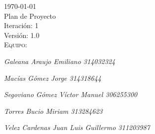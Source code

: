 \begin{titlepage}
\begin{center}
\begin{center}

\end{center}
\vspace{1mm} %
\vspace{1mm} %
{\huge \today}\\[1cm]                                     
\vspace{1mm} %
{\huge Plan de Proyecto}\\[1cm]
\vspace{1mm} %
{\huge Iteración: 1}\\[1cm]
\vspace{1mm} %
{\huge Versión: 1.0}\\[1cm]
\vspace{1mm} %
{\huge \scshape Equipo:}\\
{\Large\itshape Galeana Araujo Emiliano 314032324\par}
{\Large\itshape Macías Gómez Jorge 314318644\par}
{\Large\itshape Segoviano Gómez Víctor Manuel 306255300\par}
{\Large\itshape Torres Bucio Miriam 313284623\par}
{\Large\itshape Velez Cardenas Juan Luis Guillermo 311203987\par}
\vspace{3mm}


\vspace{10mm} %

\vfill %

\end{center}
\end{titlepage}
